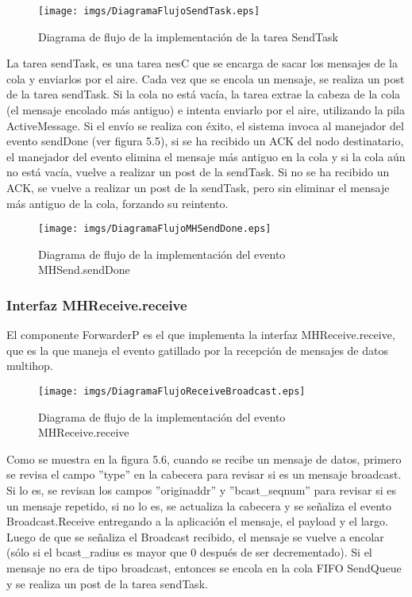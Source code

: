 \begin{figure}[H]
	\centering
 	\texttt{[image: imgs/DiagramaFlujoSendTask.eps]} 
 	\caption{Diagrama de flujo de la implementación de la tarea SendTask}
\end{figure}

La tarea sendTask, es una tarea nesC que se encarga de sacar los mensajes de la cola y enviarlos por el aire. Cada vez que se encola un mensaje, se realiza un post de la tarea sendTask. Si la cola no está vacía, la tarea extrae la cabeza de la cola (el mensaje encolado más antiguo) e intenta enviarlo por el aire, utilizando la pila ActiveMessage. Si el envío se realiza con éxito, el sistema invoca al manejador del evento sendDone (ver figura 5.5), si se ha recibido un ACK del nodo destinatario, el manejador del evento elimina el mensaje más antiguo en la cola y si la cola aún no está vacía, vuelve a realizar un post de la sendTask. Si no se ha recibido un ACK, se vuelve a realizar un post de la sendTask, pero sin eliminar el mensaje más antiguo de la cola, forzando su reintento.

\begin{figure}[H]
	\centering
 	\texttt{[image: imgs/DiagramaFlujoMHSendDone.eps]} 
 	\caption{Diagrama de flujo de la implementación del evento MHSend.sendDone}
\end{figure}

\subsubsection{Interfaz MHReceive.receive}
El componente ForwarderP es el que implementa la interfaz MHReceive.receive, que es la que maneja el evento gatillado por la recepción de mensajes de datos multihop. 

\begin{figure}[H]
	\centering
	\texttt{[image: imgs/DiagramaFlujoReceiveBroadcast.eps]}
	\caption{Diagrama de flujo de la implementación del evento MHReceive.receive}
\end{figure}

Como se muestra en la figura 5.6, cuando se recibe un mensaje de datos, primero se revisa el campo ''type'' en la cabecera para revisar si es un mensaje broadcast. Si lo es, se revisan los campos ''originaddr'' y ''bcast\_seqnum'' para revisar si es un mensaje repetido, si no lo es, se actualiza la cabecera y se señaliza el evento Broadcast.Receive entregando a la aplicación el mensaje, el payload y el largo. Luego de que se señaliza el Broadcast recibido, el mensaje se vuelve a encolar (sólo si el bcast\_radius es mayor que 0 después de ser decrementado). Si el mensaje no era de tipo broadcast, entonces se encola en la cola FIFO SendQueue y se realiza un post de la tarea sendTask.
	

